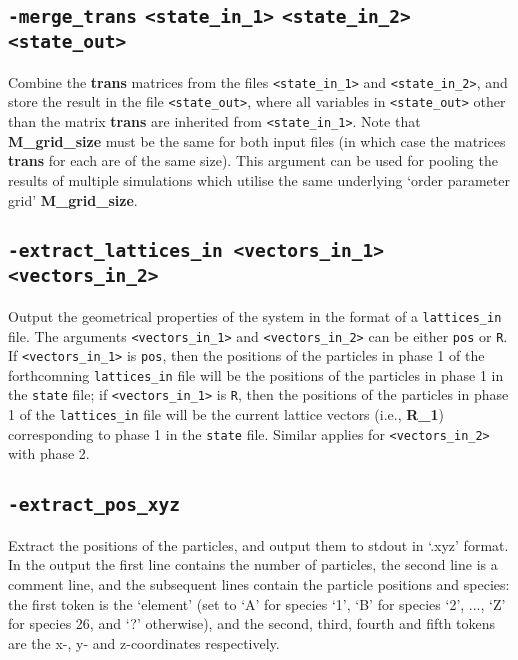 \documentclass{report}
\begin{document}
\subsection{\texttt{-merge\_trans} \texttt{<state\_in\_1>}  \texttt{<state\_in\_2>} \texttt{<state\_out>}}
Combine the \textbf{trans} matrices from the files \texttt{<state\_in\_1>} and \texttt{<state\_in\_2>}, and store the result in the 
file \texttt{<state\_out>}, where all variables in \texttt{<state\_out>} other than the matrix \textbf{trans} are inherited from 
\texttt{<state\_in\_1>}. Note that \textbf{M\_grid\_size} must be the same for both input files (in which case the matrices \textbf{trans} for
each are of the same size). This argument can be used for pooling the results of multiple simulations which utilise the same underlying
`order parameter grid' \textbf{M\_grid\_size}.

\subsection{\texttt{-extract\_lattices\_in <vectors\_in\_1> <vectors\_in\_2>}}
Output the geometrical properties of the system in the format of a \texttt{lattices\_in} file. The arguments \texttt{<vectors\_in\_1>}
and \texttt{<vectors\_in\_2>} can be either \texttt{pos} or \texttt{R}. If \texttt{<vectors\_in\_1>} is \texttt{pos}, then
the positions of the particles in phase 1 of the forthcomning \texttt{lattices\_in} file will be the positions of the particles in phase 1
in the \texttt{state} file; if \texttt{<vectors\_in\_1>} is \texttt{R}, then the positions of the particles in phase 1 of the 
\texttt{lattices\_in} file will be the current lattice vectors (i.e., \textbf{R\_1}) corresponding to phase 1 in the \texttt{state} file.
Similar applies for \texttt{<vectors\_in\_2>} with phase 2.

\subsection{\texttt{-extract\_pos\_xyz}}
Extract the positions of the particles, and output them to stdout in `.xyz' format. In the output the first line contains the number of 
particles, the second line is a comment line, and the subsequent lines contain the particle positions and species: the first token is 
the `element' (set to `A' for species `1', `B' for species `2', ..., `Z' for species 26, and `?' otherwise), and the second, third, 
fourth and fifth tokens are the x-, y- and z-coordinates respectively.
\end{document}
